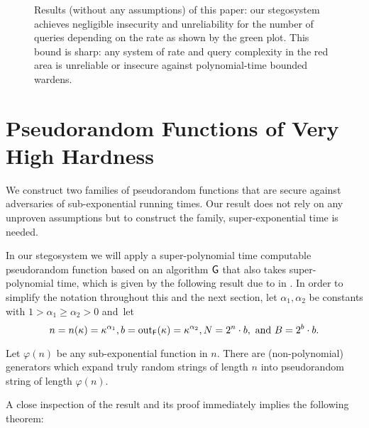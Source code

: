 \begin{figure}[ht]
\begin{tikzpicture}[xscale=0.5, yscale=0.5]
\end{tikzpicture}
\caption{Results (without any assumptions) of this paper: 
our stegosystem achieves negligible insecurity 
and unreliability for the number of queries depending 
on the rate as shown by the green plot. 
This bound is sharp: any system of rate and query complexity 
in the red area is unreliable or insecure against
polynomial-time bounded wardens.}
\label{fig:queries:our:results}
\end{figure}

\section{Pseudorandom Functions of Very High Hardness}
\label{sec:secure-very:hard:prf}

We construct two families of pseudorandom 
functions that are secure against adversaries of sub-exponential 
running times. Our result does not rely on any unproven assumptions
but to construct the family, super-exponential time is needed.

In our stegosystem we will apply a
super-polynomial time computable pseudorandom function based on an
algorithm $\algo{G}$ that also takes
super-polynomial  time, which is given by the following result due
to \citeauthor{goldreich1992sparse} in \cite{goldreich1992sparse}. In order to
simplify the notation throughout this and the next section, let 
$\alpha_1, \alpha_2$ be constants with $1>\alpha_{1}\geq
\alpha_{2}>0$  and~let
\begin{equation}\label{eq:def:const}
  n=n(\kappa)=\kappa^{\alpha_{1}},  b=\fout_{\algf}(\kappa)=\kappa^{\alpha_{2}},   N=2^{n}\cdot b,\   \text{and}\
B=2^{b}\cdot b.
\end{equation}

\begin{theorem}
Let $\varphi(n)$ be any sub-exponential function in $n$. There are
(non-polynomial) generators which expand truly random strings of length $n$
into pseudorandom string of length $\varphi(n)$. 
\end{theorem}

A close inspection of the result and its proof immediately implies the
following theorem:

